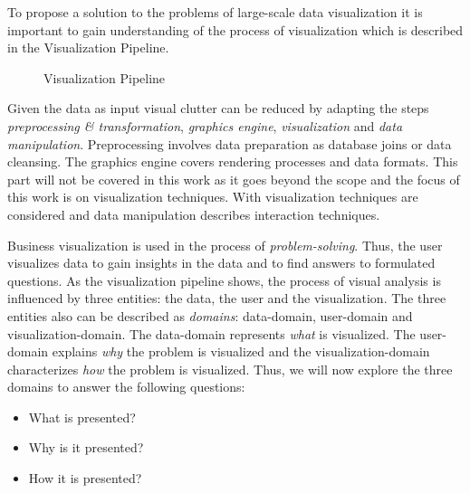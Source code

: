 \par
To propose a solution to the problems of large-scale data visualization it is important to gain understanding of the process of visualization which is described in the Visualization Pipeline. 
\begin{figure}[H]
    \centering
    \caption{Visualization Pipeline}
    \label{fig:vispipeline}
\end{figure}
Given the data as input visual clutter can be reduced by adapting the steps \textit{preprocessing \& transformation}, \textit{graphics engine}, \textit{visualization} and \textit{data manipulation}. Preprocessing involves data preparation as database joins or data cleansing. The graphics engine covers rendering processes and data formats. This part will not be covered in this work as it goes beyond the scope and the focus of this work is on visualization techniques. With visualization techniques are considered and data manipulation describes interaction techniques.  

Business visualization is used in the process of \textit{problem-solving}\cite{Bacic2012}. Thus, the user visualizes data to gain insights in the data and to find answers to formulated questions.  
As the visualization pipeline shows, the process of visual analysis is influenced by three entities: the data, the user and the visualization.
The three entities also can be described as \textit{domains}: data-domain, user-domain and visualization-domain. The data-domain represents \textit{what} is visualized. The user-domain explains \textit{why} the problem is visualized and the visualization-domain characterizes \textit{how} the problem is visualized. Thus, we will now explore the three domains to answer the following questions: 

\begin{itemize}
    \item What is presented?
    \item Why is it presented?
    \item How it is presented?
\end{itemize}


